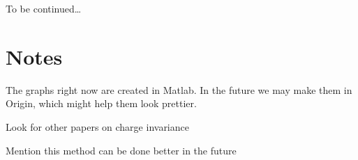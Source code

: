 \documentclass[superscriptaddress,aps,prb,11pt]{revtex4-1}
\begin{document}
\begin{acknowledgments}
To be continued\ldots
\end{acknowledgments}

\section{Notes}
The graphs right now are created in Matlab.  In the future we may make them in Origin, which might help them look prettier.

Look for other papers on charge invariance

Mention this method can be done better in the future



\end{document}
